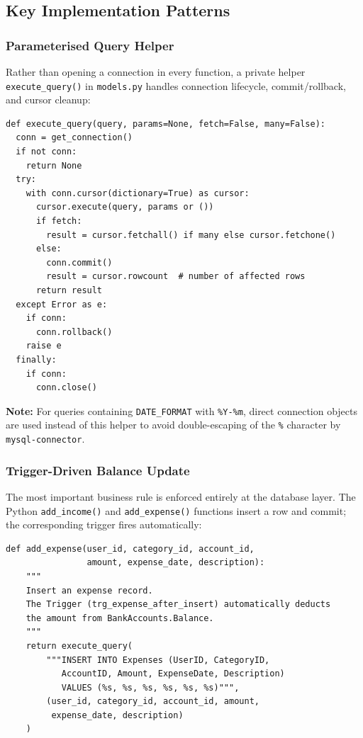 \documentclass[12pt, a4paper]{article}
\begin{document}
\subsection{Key Implementation Patterns}

\subsubsection{Parameterised Query Helper}

Rather than opening a connection in every function, a private helper
\texttt{execute\_query()} in \texttt{models.py} handles connection lifecycle,
commit/rollback, and cursor cleanup:

\begin{lstlisting}[style=pythonstyle, caption={execute\_query helper in models.py}]
def execute_query(query, params=None, fetch=False, many=False):
  conn = get_connection()
  if not conn:
    return None
  try:
    with conn.cursor(dictionary=True) as cursor:
      cursor.execute(query, params or ())
      if fetch:
        result = cursor.fetchall() if many else cursor.fetchone()
      else:
        conn.commit()
        result = cursor.rowcount  # number of affected rows
      return result
  except Error as e:
    if conn:
      conn.rollback()
    raise e
  finally:
    if conn:
      conn.close()
\end{lstlisting}

\textbf{Note:} For queries containing \texttt{DATE\_FORMAT} with \texttt{\%Y-\%m},
direct connection objects are used instead of this helper to avoid double-escaping
of the \texttt{\%} character by \texttt{mysql-connector}.

\subsubsection{Trigger-Driven Balance Update}

The most important business rule is enforced entirely at the database layer.
The Python \texttt{add\_income()} and \texttt{add\_expense()} functions insert a row
and commit; the corresponding trigger fires automatically:

\begin{lstlisting}[style=pythonstyle, caption={add\_expense function in models.py}]
def add_expense(user_id, category_id, account_id, 
                amount, expense_date, description):
    """
    Insert an expense record.
    The Trigger (trg_expense_after_insert) automatically deducts
    the amount from BankAccounts.Balance.
    """
    return execute_query(
        """INSERT INTO Expenses (UserID, CategoryID, 
           AccountID, Amount, ExpenseDate, Description)
           VALUES (%s, %s, %s, %s, %s, %s)""",
        (user_id, category_id, account_id, amount, 
         expense_date, description)
    )
\end{lstlisting}
\end{document}
